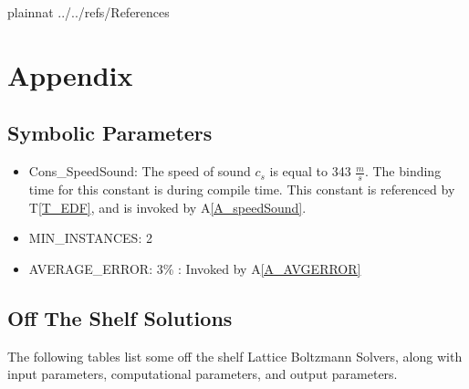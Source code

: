 \documentclass[12pt]{article}
\begin{document}
 {plainnat}
 {../../refs/References}

\newpage

\section{Appendix}

\subsection{Symbolic Parameters}
\label{symbolicpara}

\begin{itemize}

\item[\label{Cons_SpeedSound}]Cons\_SpeedSound: The speed of sound $c_s$ is equal to 343 $\frac{m}{s}$. The binding time for this constant is during compile time. This constant is referenced by T\ref{T_EDF}, and is invoked by A\ref{A_speedSound}.
\item[\label{Cons_MIN_INSTANCES}]MIN\_INSTANCES: 2
\item[\label{Cons_AVERAGE_ERROR}]AVERAGE\_ERROR: 3\% : Invoked by A\ref{A_AVGERROR}
\end{itemize}

\subsection{Off The Shelf Solutions}
\label{OTSsolutions}

The following tables list some off the shelf Lattice Boltzmann Solvers, along with input parameters, computational parameters, and output parameters.
\end{document}

